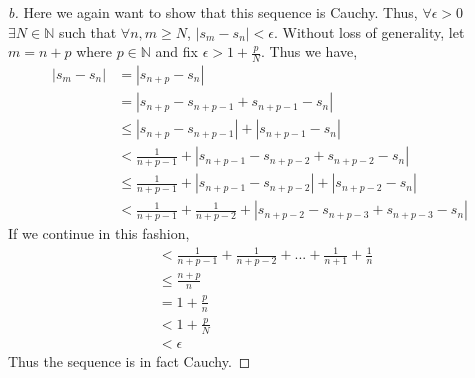 \documentclass[leqno]{article}
\theoremstyle{nonumberplain}
\newtheorem{proof}{Proof}
\begin{document}
\begin{proof}[b]
Here we again want to show that this sequence is Cauchy.  Thus, $\forall \epsilon >0$ $\exists N \in \mathbb{N}$ such that $\forall n,m \geq N$, $|s_m-s_n|<\epsilon$.  Without loss of generality, let $m=n+p$ where $p\in \mathbb{N}$ and fix $\epsilon > 1+\frac{p}{N}$.  Thus we have,
\begin{align*}
|s_m-s_n|&=|s_{n+p}-s_n|\\
&= |s_{n+p}-s_{n+p-1}+s_{n+p-1}-s_n|\\
&\leq |s_{n+p}-s_{n+p-1}|+|s_{n+p-1}-s_n|\\
&< \frac{1}{n+p-1} + |s_{n+p-1}-s_{n+p-2}+s_{n+p-2}-s_n|\\
&\leq \frac{1}{n+p-1} + |s_{n+p-1}-s_{n+p-2}|+|s_{n+p-2}-s_n|\\
&<\frac{1}{n+p-1} + \frac{1}{n+p-2} + |s_{n+p-2}-s_{n+p-3}+s_{n+p-3}-s_n|
\end{align*}
If we continue in this fashion,
\begin{align*}
&<\frac{1}{n+p-1} + \frac{1}{n+p-2} + ... + \frac{1}{n+1} + \frac{1}{n}\\
&\leq \frac{n+p}{n}\\
&=1+\frac{p}{n}\\
&<1+\frac{p}{N}\\
&<\epsilon
\end{align*}
Thus the sequence is in fact Cauchy.
\end{proof}
\end{document}
